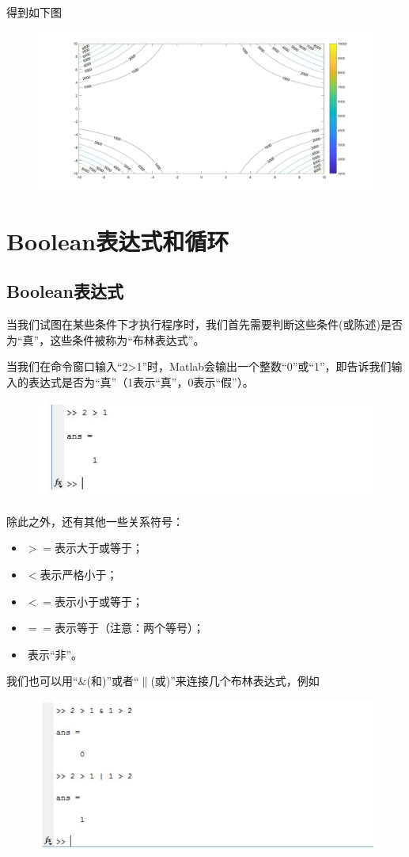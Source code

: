 \documentclass[cn,10pt,math=newtx,citestyle=gb7714-2015,bibstyle=gb7714-2015]{elegantbook}
\begin{document}
{{	得到如下图
	\begin{figure}[htbp!]
		\centering
		\includegraphics[width=0.8\linewidth]{FIG/contours1}
		\centering
	\end{figure}
	
	\section{Boolean表达式和循环}
	\subsection{Boolean表达式}
	当我们试图在某些条件下才执行程序时，我们首先需要判断这些条件(或陈述)是否为“真”，这些条件被称为“布林表达式”。
	
	当我们在命令窗口输入“2>1”时，Matlab会输出一个整数“0”或“1”，即告诉我们输入的表达式是否为“真”（1表示“真”，0表示“假”）。
	\begin{figure}[htbp!]
		\centering
		\includegraphics[width=0.8\linewidth]{FIG/Boolean}
		\centering
	\end{figure}
	
	除此之外，还有其他一些关系符号：
	
	\begin{itemize}
		\item $>=$表示大于或等于；
		\item $<$表示严格小于；
		\item $<=$表示小于或等于；
		\item $==$表示等于（注意：两个等号）；
		\item $~$表示“非”。
	\end{itemize}
	
	我们也可以用“$\&$(和)”或者“$\|$(或)”来连接几个布林表达式，例如
	\begin{figure}[htbp!]
		\centering
		\includegraphics[width=0.8\linewidth]{FIG/connecting}
		\centering
	\end{figure}
	
}}
\end{document}
